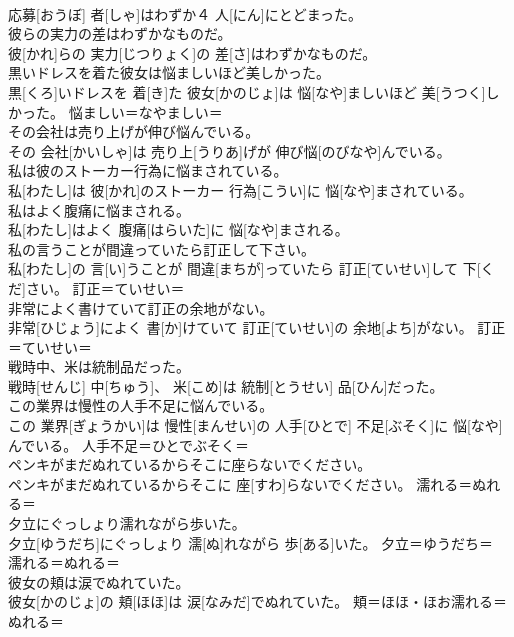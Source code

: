 \documentclass[8pt]{extreport}
\begin{document}
\begin{CJK}{UTF8}{min}
\\	応募[おうぼ] 者[しゃ]はわずか４ 人[にん]にとどまった。	
\\	彼らの実力の差はわずかなものだ。	
\\	彼[かれ]らの 実力[じつりょく]の 差[さ]はわずかなものだ。	
\\	黒いドレスを着た彼女は悩ましいほど美しかった。	
\\	黒[くろ]いドレスを 着[き]た 彼女[かのじょ]は 悩[なや]ましいほど 美[うつく]しかった。	悩ましい＝なやましい＝ 
\\	その会社は売り上げが伸び悩んでいる。	
\\	その 会社[かいしゃ]は 売り上[うりあ]げが 伸び悩[のびなや]んでいる。	
\\	私は彼のストーカー行為に悩まされている。	
\\	私[わたし]は 彼[かれ]のストーカー 行為[こうい]に 悩[なや]まされている。	
\\	私はよく腹痛に悩まされる。	
\\	私[わたし]はよく 腹痛[はらいた]に 悩[なや]まされる。	
\\	私の言うことが間違っていたら訂正して下さい。	
\\	私[わたし]の 言[い]うことが 間違[まちが]っていたら 訂正[ていせい]して 下[くだ]さい。	訂正＝ていせい＝ 
\\	非常によく書けていて訂正の余地がない。	
\\	非常[ひじょう]によく 書[か]けていて 訂正[ていせい]の 余地[よち]がない。	訂正＝ていせい＝ 
\\	戦時中、米は統制品だった。	
\\	戦時[せんじ] 中[ちゅう]、 米[こめ]は 統制[とうせい] 品[ひん]だった。	
\\	この業界は慢性の人手不足に悩んでいる。	
\\	この 業界[ぎょうかい]は 慢性[まんせい]の 人手[ひとで] 不足[ぶそく]に 悩[なや]んでいる。	人手不足＝ひとでぶそく＝ 
\\	ペンキがまだぬれているからそこに座らないでください。	
\\	ペンキがまだぬれているからそこに 座[すわ]らないでください。	濡れる＝ぬれる＝ 
\\	夕立にぐっしょり濡れながら歩いた。	
\\	夕立[ゆうだち]にぐっしょり 濡[ぬ]れながら 歩[ある]いた。	夕立＝ゆうだち＝ 
\\	濡れる＝ぬれる＝ 
\\	彼女の頬は涙でぬれていた。	
\\	彼女[かのじょ]の 頬[ほほ]は 涙[なみだ]でぬれていた。	頬＝ほほ・ほお濡れる＝ぬれる＝ 

\end{CJK}
\end{document}

